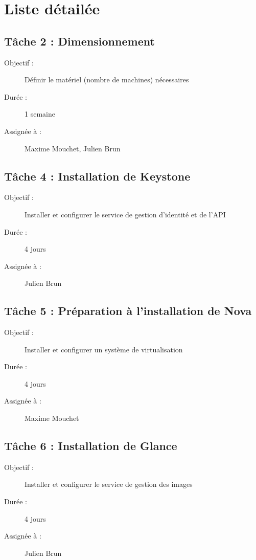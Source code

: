 \documentclass{report}
\begin{document}
\section{Liste détailée}
\subsection*{Tâche 2 : Dimensionnement}
\begin{description}
\item[Objectif :] Définir le matériel (nombre de machines) nécessaires
\item[Durée :]  1 semaine
\item[Assignée à :] Maxime Mouchet, Julien Brun
\end{description}

\subsection*{Tâche 4 : Installation de Keystone}
\begin{description}
\item[Objectif :] Installer et configurer le service de gestion d'identité et de l'API
\item[Durée :]  4 jours
\item[Assignée à :] Julien Brun
\end{description}

\subsection*{Tâche 5 : Préparation à l'installation de Nova}
\begin{description}
\item[Objectif :] Installer et configurer un système de virtualisation
\item[Durée :]  4 jours
\item[Assignée à :] Maxime Mouchet
\end{description}

\subsection*{Tâche 6 : Installation de Glance}
\begin{description}
\item[Objectif :] Installer et configurer le service de gestion des images
\item[Durée :]  4 jours
\item[Assignée à :] Julien Brun
\end{description}
\end{document}
